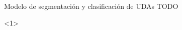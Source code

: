 \documentclass{beamer}
\begin{document}
\begin{frame}{Modelo de segmentación y clasificación de UDAs TODO}
    \begin{onlyenv}<1>
        \begin{center}
            
        \end{center}
    \end{onlyenv}
    

\end{frame}
\end{document}
